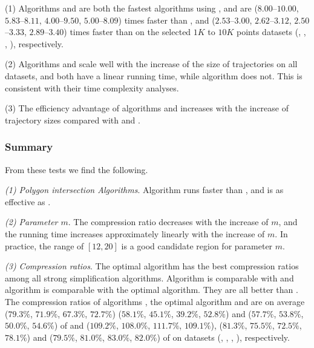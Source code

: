 {%

\ni(1) Algorithms \cist and \cista are both the fastest \lsa algorithms using \sed,
and are {($8.00$--$10.00$, $5.83$--$8.11$, $4.00$--$9.50$, $5.00$--$8.09$) times faster than \dps,
	and {($2.53$--$3.00$, $2.62$--$3.12$, $2.50$--$3.33$, $2.89$--$3.40$)}} times faster than \squishe on the selected $1K$ to $10K$ points datasets (\sercar,
\geolife, \mopsi, \pricar), respectively.

\ni(2) Algorithms \cist and \cista scale well with the increase of the size of trajectories on all datasets,
and both have a linear running time, while algorithm \dps does not.
This is consistent with their time complexity analyses.

\ni(3) The efficiency advantage of algorithms \cist and \cista increases with the increase of trajectory sizes compared with \dps and \squishe.


\subsubsection{Summary}
From these tests we find the following.

\sstab \emph{(1) Polygon intersection Algorithms}. Algorithm \rpia runs faster than \cpia, and is as effective as \cpia.

\sstab\emph{(2) Parameter $m$}. The compression ratio decreases with the increase of $m$, and the running time increases approximately linearly with the increase of $m$. In practice, the range of $[12, 20]$ is a good candidate region for parameter $m$.

\sstab\emph{(3) Compression ratios}. The optimal \lsa algorithm has the best compression ratios among all strong simplification algorithms. Algorithm \cist is comparable with \dps and algorithm \cista is comparable with the optimal \lsa algorithm.
They are all better than \squishe.
The compression ratios of algorithms \cist, the optimal algorithm and \cista are on average
($79.3\%$, $71.9\%$, $67.3\%$, $72.7\%$)
{($58.1\%$, $45.1\%$, $39.2\%$, $52.8\%$)} and ($57.7\%$, $53.8\%$, $50.0\%$, $54.6\%$) of \squishe
and ($109.2\%$, $108.0\%$, $111.7\%$, $109.1\%$), {($81.3\%$, $75.5\%$, $72.5\%$, $78.1\%$)} and ($79.5\%$, $81.0\%$, $83.0\%$, $82.0\%$) of \dps on {datasets} (\sercar, \geolife, \mopsi, \pricar), respectively.

}
